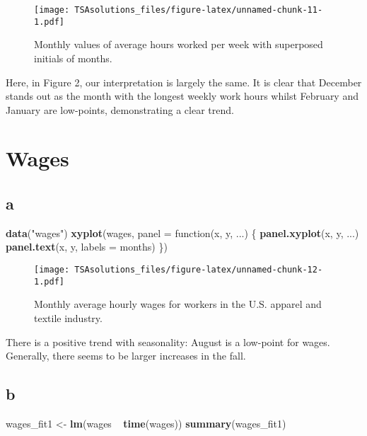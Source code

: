 \documentclass[]{book}
\newenvironment{Shaded}{\begin{snugshade}}{\end{snugshade}}
\newcommand{\KeywordTok}[1]{\textcolor[rgb]{0.13,0.29,0.53}{\textbf{{#1}}}}
\newcommand{\DataTypeTok}[1]{\textcolor[rgb]{0.13,0.29,0.53}{{#1}}}
\newcommand{\StringTok}[1]{\textcolor[rgb]{0.31,0.60,0.02}{{#1}}}
\newcommand{\NormalTok}[1]{{#1}}
\theoremstyle{definition}
\theoremstyle{definition}
\theoremstyle{remark}
\begin{document}
\begin{figure}[htbp]
\centering
\texttt{[image: TSAsolutions\_files/figure-latex/unnamed-chunk-11-1.pdf]}
\caption{\label{fig:unnamed-chunk-11}Monthly values of average hours worked
per week with superposed initials of months.}
\end{figure}

Here, in Figure 2, our interpretation is largely the same. It is clear
that December stands out as the month with the longest weekly work hours
whilst February and January are low-points, demonstrating a clear trend.

\section{Wages}\label{wages}

\subsection*{a}\label{a-22}

\begin{Shaded}
\begin{Highlighting}[]
\KeywordTok{data}\NormalTok{(}\StringTok{"wages"}\NormalTok{)}
\KeywordTok{xyplot}\NormalTok{(wages, }\DataTypeTok{panel =} \NormalTok{function(x, y, ...) \{}
  \KeywordTok{panel.xyplot}\NormalTok{(x, y, ...)}
  \KeywordTok{panel.text}\NormalTok{(x, y, }\DataTypeTok{labels =} \NormalTok{months)}
\NormalTok{\})}
\end{Highlighting}
\end{Shaded}

\begin{figure}[htbp]
\centering
\texttt{[image: TSAsolutions\_files/figure-latex/unnamed-chunk-12-1.pdf]}
\caption{\label{fig:unnamed-chunk-12}Monthly average hourly wages for
workers in the U.S. apparel and textile industry.}
\end{figure}

There is a positive trend with seasonality: August is a low-point for
wages. Generally, there seems to be larger increases in the fall.

\subsection*{b}\label{b-22}

\begin{Shaded}
\begin{Highlighting}[]
\NormalTok{wages_fit1 <-}\StringTok{ }\KeywordTok{lm}\NormalTok{(wages ~}\StringTok{ }\KeywordTok{time}\NormalTok{(wages))}
\KeywordTok{summary}\NormalTok{(wages_fit1)}
\end{Highlighting}
\end{Shaded}
\end{document}
